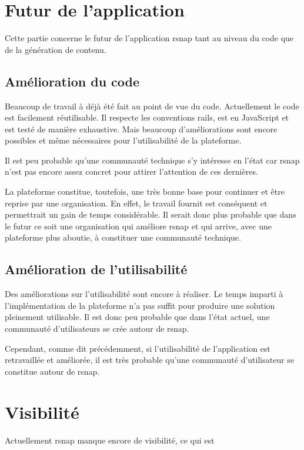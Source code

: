 \section{Futur de l'application}
Cette partie concerne le futur de l'application \gls{rsnap} tant au niveau du code que de la génération de contenu.

\subsection{Amélioration du code}
Beaucoup de travail à déjà été fait au point de vue du code. Actuellement le code est facilement réutilisable. Il respecte les conventions \gls{rails}, est en JavaScript et est testé de manière exhaustive. Mais beaucoup d'améliorations sont encore possibles et même nécessaires pour l'utilisabilité de la plateforme.

Il est peu probable qu'une communauté technique s'y intéresse en l'état car \gls{rsnap} n'est pas encore assez concret pour attirer l'attention de ces dernières.

La plateforme constitue, toutefois, une très bonne base pour continuer et être reprise par une organisation. En effet, le travail fournit est conséquent et permettrait un gain de temps considérable. Il serait donc plus probable que dans le futur ce soit une organisation qui améliore \gls{rsnap} et qui arrive, avec une plateforme plus aboutie, à constituer une communauté technique.

\subsection{Amélioration de l'utilisabilité}
Des améliorations sur l'utilisabilité sont encore à réaliser. Le temps imparti à l'implémentation de la plateforme n'a pas suffit pour produire une solution pleinement utilisable. Il est donc peu probable que dans l'état actuel, une communauté d'utilisateurs se crée autour de \gls{rsnap}.

Cependant, comme dit précédemment, si l'utilisabilité de l'application est retravaillée et améliorée, il est très probable qu'une communauté d'utilisateur se constitue autour de \gls{rsnap}.

\section{Visibilité}
Actuellement \gls{rsnap} manque encore de visibilité, ce qui est 


%
%
%
%
%
%
